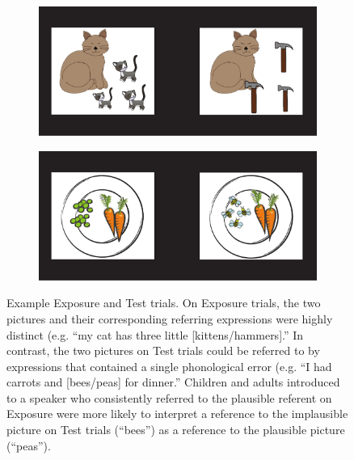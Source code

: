 \documentclass[man,floatsintext]{apa6}
\begin{document}
\begin{figure}[tb]
     \centering
        \begin{subfigure}[b]{.4 \textwidth}
            \caption{\label{fig:exposure}}
            \includegraphics[width=\textwidth]{figures/exposure.pdf}
        \end{subfigure}\quad
        \vspace{12 pt}
        \begin{subfigure}[b]{.4 \textwidth}
           \caption{\label{fig:test}}
           \includegraphics[width=\textwidth]{figures/testing.pdf}
        \end{subfigure}
    \caption{Example Exposure and Test trials. On Exposure trials, the two pictures and their corresponding referring expressions were highly distinct (e.g. ``my cat has three little [kittens/hammers].'' In contrast, the two pictures on Test trials could be referred to by expressions that contained a single phonological error (e.g. ``I had carrots and [bees/peas] for dinner.'' Children and adults introduced to a speaker who consistently referred to the plausible referent on Exposure were more likely to interpret a reference to the implausible picture on Test trials (``bees'') as a reference to the plausible picture (``peas'').}
   \label{fig:stimuli}
\end{figure}
\end{document}
